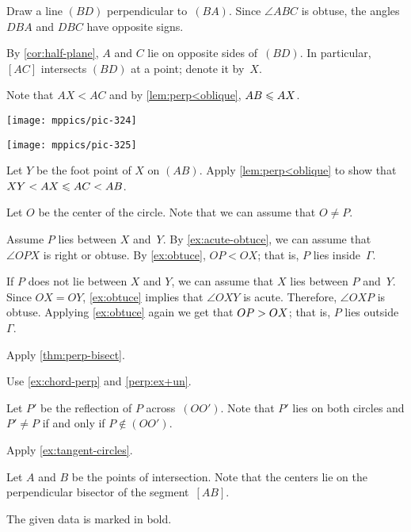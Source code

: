\begin{multicols}{2}
Draw a line $(BD)$ perpendicular to~$(BA)$.
Since $\angle ABC$ is obtuse, 
the angles $DBA$ and $DBC$ have opposite signs.

By \ref{cor:half-plane},
$A$ and $C$ lie on opposite sides of~$(BD)$.
In particular, $[AC]$ intersects $(BD)$ at a point; denote it by~$X$.

Note that $AX<AC$ and by \ref{lem:perp<oblique}, $AB\z\le AX$.

\begin{Figure}
\vskip-0mm
\begin{minipage}{.49\textwidth}
\centering
\texttt{[image: mppics/pic-324]}
\end{minipage}
\hfill
\begin{minipage}{.49\textwidth}
\centering
\texttt{[image: mppics/pic-325]}
\end{minipage}
\end{Figure}

Let $Y$ be the foot point of $X$ on $(AB)$.
Apply \ref{lem:perp<oblique} to show that 
$XY<AX\le AC\z<AB$.

Let $O$ be the center of the circle.
Note that we can assume that $O\ne P$.


Assume $P$ lies between $X$ and~$Y$.
By \ref{ex:acute-obtuce}, we can assume that $\angle OPX$ is right or obtuse.
By \ref{ex:obtuce}, $OP<OX$; 
that is, $P$ lies inside~$\Gamma$.

If $P$ does not lie between $X$ and $Y$, we can assume that $X$ lies between $P$ and~$Y$.
Since $OX=OY$, \ref{ex:obtuce} implies that $\angle OXY$ is acute.
Therefore, $\angle OXP$ is obtuse.
Applying \ref{ex:obtuce} again we get that $OP\z>OX$;
that is, $P$ lies outside~$\Gamma$.

 Apply \ref{thm:perp-bisect}.

 Use \ref{ex:chord-perp} and \ref{perp:ex+un}.

Let $P'$ be the reflection of $P$ across~$(OO')$.
Note that $P'$ lies on both circles and $P'\ne P$ if and only if $P\notin(OO')$.

  Apply \ref{ex:tangent-circles}.

Let $A$ and $B$ be the points of intersection.
Note that the centers lie on the perpendicular bisector of the segment~$[AB]$.

The given data is marked in bold.


\end{multicols}
